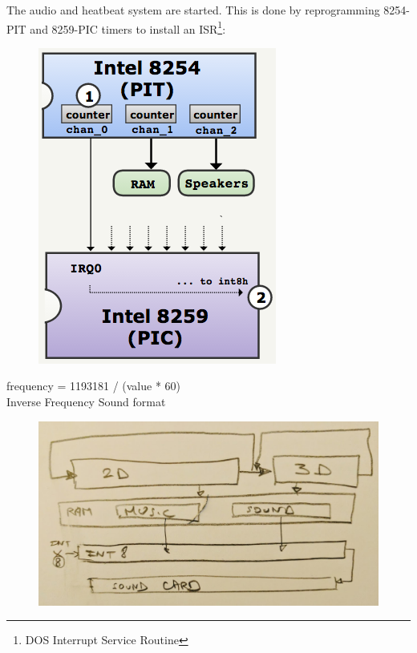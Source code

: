 The audio and heatbeat system are started. This is done by reprogramming 8254-PIT and 8259-PIC timers to install an ISR\footnote{DOS Interrupt Service Routine}:\\
\begin{figure}[H]
\centering
 \includegraphics[width=.5\textwidth]{imgs/drawings/heatbeats.png}
 \end{figure}
\par
frequency = 1193181 / (value * 60)\\
Inverse Frequency Sound format\\
\par
\begin{figure}[H]
\centering
 \includegraphics[width=\textwidth]{imgs/drawings/three_blocks.png}
 \end{figure}

